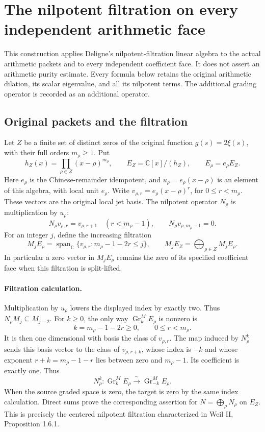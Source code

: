 \section{The nilpotent filtration on every independent arithmetic face}
\label{sec:mixed-face-monodromy}

This construction applies Deligne's nilpotent-filtration linear algebra to the
actual arithmetic packets and to every independent coefficient face. It does
not assert an arithmetic purity estimate. Every formula below retains the
original arithmetic dilation, its scalar eigenvalue, and all its nilpotent
terms. The additional grading operator is recorded as an additional operator.

\subsection{Original packets and the filtration}

Let \(Z\) be a finite set of distinct zeros of the original function
\(g(s)=2\xi(s)\), with their full orders \(m_\rho\geq1\). Put
\[
 h_Z(x)=\prod_{\rho\in Z}(x-\rho)^{m_\rho},\qquad
 E_Z=\mathbb C[x]/(h_Z),\qquad
 E_\rho=e_\rho E_Z.
 \tag{MW1}
\]
Here \(e_\rho\) is the Chinese-remainder idempotent, and
\(u_\rho=e_\rho(x-\rho)\) is an element of this algebra, with local unit
\(e_\rho\). Write \(v_{\rho,r}=e_\rho(x-\rho)^r\), for
\(0\leq r<m_\rho\). These vectors are the original local jet basis.
The nilpotent operator \(N_\rho\) is multiplication by \(u_\rho\):
\[
 N_\rho v_{\rho,r}=v_{\rho,r+1}\quad(r<m_\rho-1),\qquad
 N_\rho v_{\rho,m_\rho-1}=0.
 \tag{MW2}
\]
For an integer \(j\), define the increasing filtration
\[
 M_jE_\rho
 =\operatorname{span}_{\mathbb C}
   \{v_{\rho,r}:m_\rho-1-2r\leq j\},\qquad
 M_jE_Z=\bigoplus_{\rho\in Z}M_jE_\rho .
 \tag{MW3}
\]
In particular a zero vector in \(M_jE_\rho\) remains the zero of its specified
coefficient face when this filtration is split-lifted.

\paragraph{Filtration calculation.}
Multiplication by \(u_\rho\) lowers the displayed index by exactly two.
Thus \(N_\rho M_j\subseteq M_{j-2}\). For \(k\geq0\), the only way
\(\operatorname{Gr}_k^M E_\rho\) is nonzero is
\[
 k=m_\rho-1-2r\geq0,\qquad 0\leq r<m_\rho .
\]
It is then one dimensional with basis the class of \(v_{\rho,r}\).
The map induced by \(N_\rho^k\) sends this basis vector to the class of
\(v_{\rho,r+k}\), whose index is \(-k\) and whose exponent
\(r+k=m_\rho-1-r\) lies between zero and \(m_\rho-1\).
Its coefficient is exactly one. Thus
\[
 N_\rho^k:\operatorname{Gr}_k^M E_\rho
       \xrightarrow{\;\sim\;}\operatorname{Gr}_{-k}^M E_\rho .
 \tag{MW4}
\]
When the source graded space is zero, the target is zero by the same
index calculation. Direct sums prove the corresponding assertion for
\(N=\bigoplus_\rho N_\rho\) on \(E_Z\).
This is precisely the centered nilpotent filtration characterized in
Weil II, Proposition 1.6.1.

